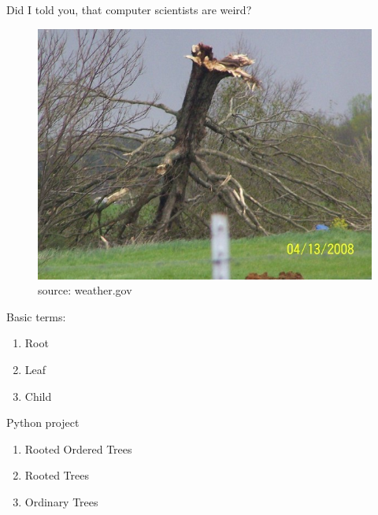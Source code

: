 \documentclass{beamer}
\begin{document}
\begin{frame}{Did I told you, that computer scientists are weird?}

\begin{figure}
	\includegraphics[scale=1]{img2}
	\caption{\label{fig:your-figure} source: weather.gov}
\end{figure}
\end{frame}

\begin{frame}
Basic terms:
	\begin{enumerate}
      \item Root
      \item Leaf
      \item Child
    \end{enumerate}
\end{frame}


\begin{frame}{Python project}
	\begin{enumerate}
      \item Rooted Ordered Trees
      \item Rooted Trees
      \item Ordinary Trees
    \end{enumerate}
\end{frame}
\end{document}

